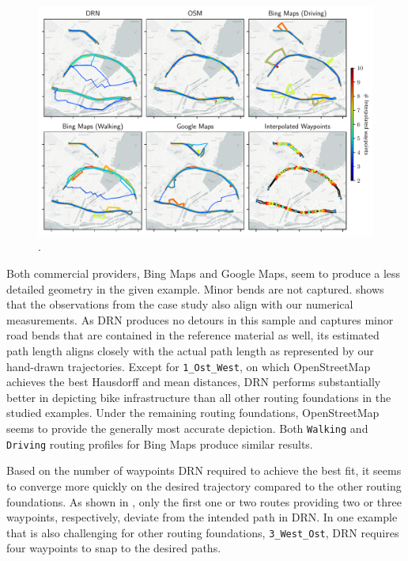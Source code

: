 \begin{figure}[t]
\centering 
\includegraphics[width=\linewidth]{images/routing-convergence-process.pdf}
\caption{.}
\label{fig:routing-convergence-process}
\end{figure}

Both commercial providers, Bing Maps and Google Maps, seem to produce a less detailed geometry in the given example. Minor bends are not captured.  shows that the observations from the case study also align with our numerical measurements. As DRN produces no detours in this sample and captures minor road bends that are contained in the reference material as well, its estimated path length aligns closely with the actual path length as represented by our hand-drawn trajectories. Except for \texttt{1\_Ost\_West}, on which OpenStreetMap achieves the best Hausdorff and mean distances, DRN performs substantially better in depicting bike infrastructure than all other routing foundations in the studied examples. Under the remaining routing foundations, OpenStreetMap seems to provide the generally most accurate depiction. Both \texttt{Walking} and \texttt{Driving} routing profiles for Bing Maps produce similar results.

Based on the number of waypoints DRN required to achieve the best fit, it seems to converge more quickly on the desired trajectory compared to the other routing foundations. As shown in , only the first one or two routes providing two or three waypoints, respectively, deviate from the intended path in DRN. In one example that is also challenging for other routing foundations, \texttt{3\_West\_Ost}, DRN requires four waypoints to snap to the desired paths.

